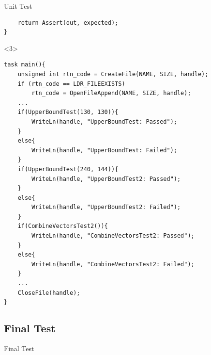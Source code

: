 \begin{frame}[fragile]{Unit Test}
\begin{onlyenv}
\begin{center}
\begin{minipage}[H]{0.9\linewidth}
\begin{lstlisting}
  	return Assert(out, expected);
}
\end{lstlisting} 
\end{minipage}
\end{center}
\end{onlyenv}
\begin{onlyenv}<3>
\begin{center}
\begin{minipage}[H]{0.9\linewidth}
\begin{lstlisting}
task main(){
	unsigned int rtn_code = CreateFile(NAME, SIZE, handle);
   	if (rtn_code == LDR_FILEEXISTS)
     	rtn_code = OpenFileAppend(NAME, SIZE, handle);
  	...
 	if(UpperBoundTest(130, 130)){
    	WriteLn(handle, "UpperBoundTest: Passed");
  	}
 	else{
    	WriteLn(handle, "UpperBoundTest: Failed");
  	}
  	if(UpperBoundTest(240, 144)){
    	WriteLn(handle, "UpperBoundTest2: Passed");
  	}
  	else{
    	WriteLn(handle, "UpperBoundTest2: Failed");
  	}
  	if(CombineVectorsTest2()){
    	WriteLn(handle, "CombineVectorsTest2: Passed");
  	}
  	else{
    	WriteLn(handle, "CombineVectorsTest2: Failed");
  	}
  	...
  	CloseFile(handle);
}
\end{lstlisting} 
\end{minipage}
\end{center}
\end{onlyenv}
\end{frame}

\subsection{Final Test}
\begin{frame}{Final Test}
\begin{itemize}
\end{itemize}
\end{frame}